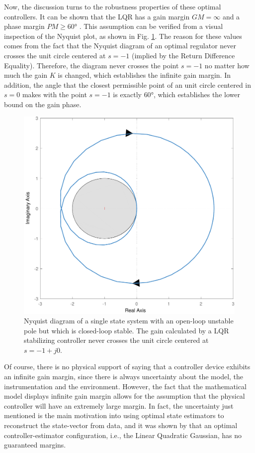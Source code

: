 \documentclass[a4paper,11pt]{book}
\numberwithin{figure}{chapter}
\numberwithin{equation}{chapter}
\numberwithin{table}{chapter}
\theoremstyle{definition}
\begin{document}
Now, the discussion turns to the robustness properties of these optimal controllers. It can be shown that the LQR has a gain margin $GM = \infty$ and a phase margin $PM \geq \ang{60}$ \cite{Moore:1990}. This assumption can be verified from a visual inspection of the Nyquist plot, as shown in Fig. \ref{fig:lqrProperties01}. The reason for these values comes from the fact that the Nyquist diagram of an optimal regulator never crosses the unit circle centered at $s = -1$ (implied by the Return Difference Equality). Therefore, the diagram never crosses the point $s = -1$ no matter how much the gain $K$ is changed, which establishes the infinite gain margin. In addition, the angle that the closest permissible point of an unit circle centered in $s = 0$ makes with the point $s = -1$ is exactly $\ang{60}$, which establishes the lower bound on the gain phase.

\begin{figure}[ht]
	\centering
	\includegraphics[scale=0.65]{chapter4/report_ch4_2}
	\caption{Nyquist diagram of a single state system with an open-loop unstable pole but which is closed-loop stable. The gain calculated by a LQR stabilizing controller never crosses the unit circle centered at $s = -1 + j0$.}
	\label{fig:lqrProperties01}
\end{figure}

Of course, there is no physical support of saying that a controller device exhibits an infinite gain margin, since there is always uncertainty about the model, the instrumentation and the environment. However, the fact that the mathematical model displays infinite gain margin allows for the assumption that the physical controller will have an extremely large margin. In fact, the uncertainty just mentioned is the main motivation into using optimal state estimators to reconstruct the state-vector from data, and it was shown by \cite{Doyle:1978} that an optimal controller-estimator configuration, i.e., the Linear Quadratic Gaussian, has no guaranteed margins.
\end{document}
